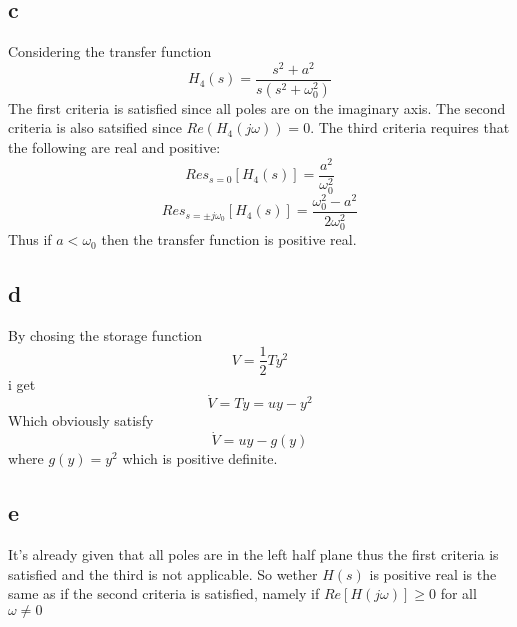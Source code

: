 \documentclass[11pt]{article}
\begin{document}
\subsection*{c}
Considering the transfer function
\[H_4(s) = \frac{s^2 + a^2}{s(s^2 + \omega_0^2)}\]
The first criteria is satisfied since all poles are on the imaginary axis. The second criteria is also satsified since $Re(H_4(j \omega)) = 0$. The third criteria requires that the following are real and positive:
\[Res_{s = 0}[H_4(s)] = \frac{a^2}{\omega_0^2}\]
\[Res_{s = \pm j\omega_0}[H_4(s)] = \frac{\omega_0^2 - a^2}{2\omega_0^2}\]
Thus if $a < \omega_0$ then the transfer function is positive real.

\subsection*{d}

By chosing the storage function
\[V = \frac{1}{2} T y^2\]
i get 
\[\dot{V} = Ty = uy - y^2\]
Which obviously satisfy
\[\dot{V} = uy - g(y)\]
where $g(y) = y^2$ which is positive definite.

\subsection*{e}
It's already given that all poles are in the left half plane thus the first criteria is satisfied and the third is not applicable. So wether $H(s)$ is positive real is the same as if the second criteria is satisfied, namely if $Re[H(j\omega)] \geq 0$ for all $\omega \not = 0$ 
\end{document}
